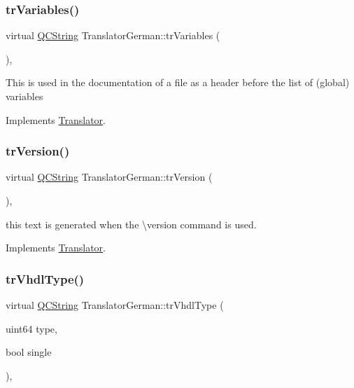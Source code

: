 \mbox{\label{class_translator_german_acf2415c174b045d970640d2ee059b76a}} 
\subsubsection{\texorpdfstring{trVariables()}{trVariables()}}
{\footnotesize\ttfamily virtual \mbox{\hyperlink{class_q_c_string}{Q\+C\+String}} Translator\+German\+::tr\+Variables (\begin{DoxyParamCaption}{ }\end{DoxyParamCaption})\hspace{0.3cm}{\ttfamily [inline]}, {\ttfamily [virtual]}}

This is used in the documentation of a file as a header before the list of (global) variables 

Implements \mbox{\hyperlink{class_translator}{Translator}}.

\mbox{\label{class_translator_german_a28bf9600f4d382a47492b08f71995fe4}} 
\subsubsection{\texorpdfstring{trVersion()}{trVersion()}}
{\footnotesize\ttfamily virtual \mbox{\hyperlink{class_q_c_string}{Q\+C\+String}} Translator\+German\+::tr\+Version (\begin{DoxyParamCaption}{ }\end{DoxyParamCaption})\hspace{0.3cm}{\ttfamily [inline]}, {\ttfamily [virtual]}}

this text is generated when the \textbackslash{}version command is used. 

Implements \mbox{\hyperlink{class_translator}{Translator}}.

\mbox{\label{class_translator_german_aaf491e95c9b30b1a99025c8287c42029}} 
\subsubsection{\texorpdfstring{trVhdlType()}{trVhdlType()}}
{\footnotesize\ttfamily virtual \mbox{\hyperlink{class_q_c_string}{Q\+C\+String}} Translator\+German\+::tr\+Vhdl\+Type (\begin{DoxyParamCaption}\item[{uint64}]{type,  }\item[{bool}]{single }\end{DoxyParamCaption})\hspace{0.3cm}{\ttfamily [inline]}, {\ttfamily [virtual]}}

